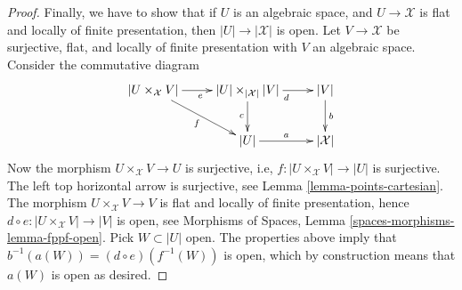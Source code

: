 \documentclass[10pt,a4paper]{amsart}
\theoremstyle{plain}
\theoremstyle{definition}
\theoremstyle{remark}
\numberwithin{equation}{subsection}
\begin{document}
\begin{proof}
\medskip\noindent
Finally, we have to show that if $U$ is an algebraic space, and
$U \to \mathcal{X}$ is flat and locally of finite presentation, then
$|U| \to |\mathcal{X}|$ is open. Let $V \to \mathcal{X}$ be surjective,
flat, and locally of finite presentation with $V$ an algebraic space.
Consider the commutative diagram
$$
\xymatrix{
|U \times_\mathcal{X} V| \ar[r]_e \ar[rd]_f &
|U| \times_{|\mathcal{X}|} |V| \ar[d]_c \ar[r]_d &
|V| \ar[d]^b \\
& |U| \ar[r]^a & |\mathcal{X}|
}
$$
Now the morphism $U \times_\mathcal{X} V \to U$ is surjective, i.e,
$f : |U \times_\mathcal{X} V| \to |U|$ is surjective.
The left top horizontal arrow is surjective, see
Lemma \ref{lemma-points-cartesian}.
The morphism $U \times_\mathcal{X} V \to V$ is flat and locally of finite
presentation, hence $d \circ e : |U \times_\mathcal{X} V| \to |V|$ is open,
see
Morphisms of Spaces, Lemma \ref{spaces-morphisms-lemma-fppf-open}.
Pick $W \subset |U|$ open. The properties above imply that
$b^{-1}(a(W)) = (d \circ e)(f^{-1}(W))$ is open, which by construction means
that $a(W)$ is open as desired.
\end{proof}
\end{document}
